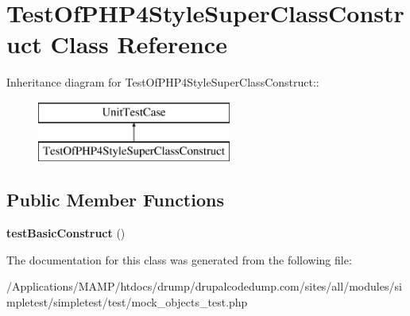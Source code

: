 \hypertarget{class_test_of_p_h_p4_style_super_class_construct}{
\section{TestOfPHP4StyleSuperClassConstruct Class Reference}
\label{class_test_of_p_h_p4_style_super_class_construct}
}
Inheritance diagram for TestOfPHP4StyleSuperClassConstruct::\begin{figure}[H]
\begin{center}
\leavevmode
\includegraphics[height=2cm]{class_test_of_p_h_p4_style_super_class_construct}
\end{center}
\end{figure}
\subsection*{Public Member Functions}
\begin{DoxyCompactItemize}
\item 
\hypertarget{class_test_of_p_h_p4_style_super_class_construct_a367535c3cffdafb2563b3a1b0fc6bc74}{
{\bfseries testBasicConstruct} ()}
\label{class_test_of_p_h_p4_style_super_class_construct_a367535c3cffdafb2563b3a1b0fc6bc74}

\end{DoxyCompactItemize}


The documentation for this class was generated from the following file:\begin{DoxyCompactItemize}
\item 
/Applications/MAMP/htdocs/drump/drupalcodedump.com/sites/all/modules/simpletest/simpletest/test/mock\_\-objects\_\-test.php\end{DoxyCompactItemize}
